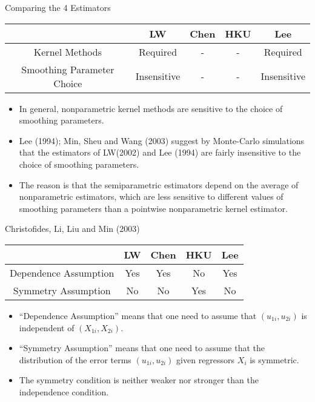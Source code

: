 \documentclass[xcolor=svgnames,dvipdfmx,cjk]{beamer}
\theoremstyle{example}
\begin{document}
\begin{frame}{Comparing the 4 Estimators}
      \begin{center}
      \small{
            \begin{tabular}{c|cccc}
                  \hline
                        & LW & Chen & HKU & Lee \\
                  \hline
                  Kernel Methods & Required & - & - & Required \\
                  Smoothing Parameter Choice & Insensitive & - & - & Insensitive \\
                  \hline
            \end{tabular}
      }
      \end{center}
      \begin{itemize}
            \item In general, nonparametric kernel methods are sensitive to the choice of smoothing parameters.
            \item Lee (1994); Min, Sheu and Wang (2003) suggest by Monte-Carlo simulations that 
                  the estimators of LW(2002) and Lee (1994) are fairly insensitive to the choice of smoothing parameters.
            \item The reason is that 
                  the semiparametric estimators depend on the average of nonparametric estimators, 
                  which are less sensitive to different values of smoothing parameters than a pointwise nonparametric kernel estimator.
      \end{itemize}
\end{frame}

\begin{frame}{Christofides, Li, Liu and Min (2003)}
      \begin{center}
      \small{
            \begin{tabular}{c|cccc}
                  \hline
                        & LW & Chen & HKU & Lee \\
                  \hline
                  Dependence Assumption & Yes & Yes & No & Yes \\
                  Symmetry Assumption & No & No & Yes & No \\ 
                  \hline
            \end{tabular}
      }
      \end{center}
      \begin{itemize}
            \item ``Dependence Assumption'' means that 
                  one need to assume that 
                  $(u_{1i}, u_{2i})$ is independent of $(X_{1i}, X_{2i})$.
            \item ``Symmetry Assumption'' means that one need to assume that 
                  the distribution of the error terms $(u_{1i}, u_{2i})$ 
                  given regressors $X_i$ is symmetric.
            \item The symmetry condition is neither weaker nor stronger than the independence condition.
      \end{itemize}
\end{frame}
\end{document}
